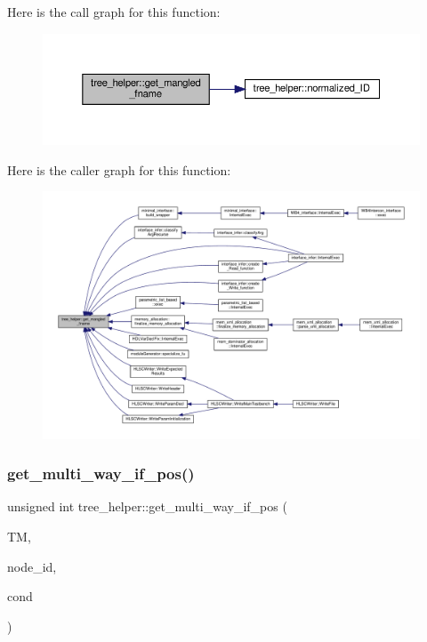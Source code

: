 Here is the call graph for this function\+:
\nopagebreak
\begin{figure}[H]
\begin{center}
\leavevmode
\includegraphics[width=350pt]{d7/d99/classtree__helper_a39ce89663878170eee6f6c9bed7efc65_cgraph}
\end{center}
\end{figure}
Here is the caller graph for this function\+:
\nopagebreak
\begin{figure}[H]
\begin{center}
\leavevmode
\includegraphics[width=350pt]{d7/d99/classtree__helper_a39ce89663878170eee6f6c9bed7efc65_icgraph}
\end{center}
\end{figure}
\mbox{\label{classtree__helper_afe27e1d8dfb2b64a5def44bafa3fe0eb}} 
\subsubsection{\texorpdfstring{get\+\_\+multi\+\_\+way\+\_\+if\+\_\+pos()}{get\_multi\_way\_if\_pos()}}
{\footnotesize\ttfamily unsigned int tree\+\_\+helper\+::get\+\_\+multi\+\_\+way\+\_\+if\+\_\+pos (\begin{DoxyParamCaption}\item[{const \hyperlink{tree__manager_8hpp_a792e3f1f892d7d997a8d8a4a12e39346}{tree\+\_\+manager\+Const\+Ref} \&}]{TM,  }\item[{unsigned int}]{node\+\_\+id,  }\item[{unsigned int}]{cond }\end{DoxyParamCaption})\hspace{0.3cm}{\ttfamily [static]}}



